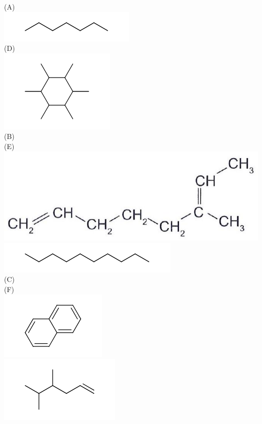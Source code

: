 \documentclass[10pt]{article}
\begin{document}
(A)\\
\includegraphics{smile-9e1088d2e081ba6019dab999d5decb5b66c96632}\\
(D)\\
\includegraphics{smile-2251b33f9962c92f2a71e567c41b5d1b0f149d6e}\\
(B)\\
(E)\\
\includegraphics[max width=\textwidth, center]{2025_10_23_ae7aef68fb3b41082d29g-20}\\
\includegraphics{smile-1046ed51bf9508ee51d1eaec3dd1ea5444b5b344}\\
(C)\\
(F)\\
\includegraphics{smile-cb1d4acc99c1ad4fd96277dbdc55a345910d9466}\\
\includegraphics{smile-3a37e925033d99ff1cf5b5d6305b9ea7968330e1}\\
\end{document}
